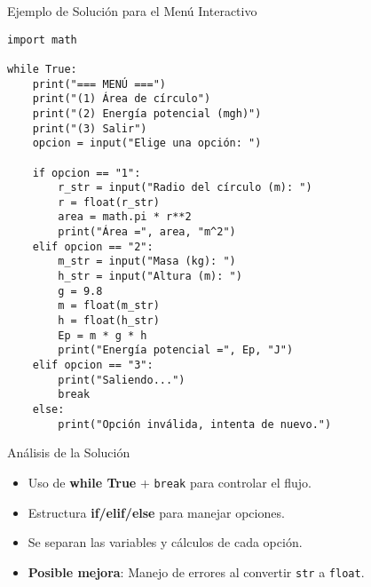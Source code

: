 \documentclass[10pt]{beamer}
\begin{document}
\begin{frame}[fragile]{Ejemplo de Solución para el Menú Interactivo}
\begin{verbatim}
import math

while True:
    print("=== MENÚ ===")
    print("(1) Área de círculo")
    print("(2) Energía potencial (mgh)")
    print("(3) Salir")
    opcion = input("Elige una opción: ")

    if opcion == "1":
        r_str = input("Radio del círculo (m): ")
        r = float(r_str)
        area = math.pi * r**2
        print("Área =", area, "m^2")
    elif opcion == "2":
        m_str = input("Masa (kg): ")
        h_str = input("Altura (m): ")
        g = 9.8
        m = float(m_str)
        h = float(h_str)
        Ep = m * g * h
        print("Energía potencial =", Ep, "J")
    elif opcion == "3":
        print("Saliendo...")
        break
    else:
        print("Opción inválida, intenta de nuevo.")
\end{verbatim}
\end{frame}

\begin{frame}{Análisis de la Solución}
  \begin{itemize}
    \item Uso de \textbf{while True} + \texttt{break} para controlar el flujo.
    \item Estructura \textbf{if/elif/else} para manejar opciones.
    \item Se separan las variables y cálculos de cada opción.
    \item \textbf{Posible mejora}: Manejo de errores al convertir \texttt{str} a \texttt{float}.
  \end{itemize}
\end{frame}
\end{document}
